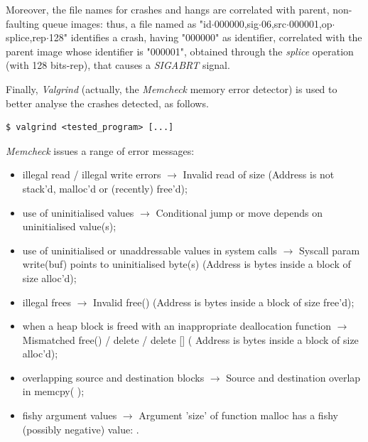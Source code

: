 Moreover, the file names for crashes and hangs are correlated with parent, non-faulting queue images\parencite{AFL_readme}: thus, a file named as "id$\cdot$000000,sig$\cdot$06,src$\cdot$000001,op$\cdot$splice,rep$\cdot$128" identifies a crash, having "000000" as identifier, correlated with the parent image whose identifier is "000001", obtained through the \textit{splice} operation (with 128 bits-rep), that causes a \textit{SIGABRT} signal.

Finally, \textit{Valgrind}\parencite{Valgrind} (actually, the \textit{Memcheck} memory error detector\parencite{MC}) is used to better analyse the crashes detected, as follows.
\begin{lstlisting}
$ valgrind <tested_program> [...]
\end{lstlisting}

\textit{Memcheck} issues a range of error messages:
\begin{itemize}
    \item illegal read / illegal write errors\parencite{MC_badrw} $\xrightarrow{}$ Invalid read of size \omissis (Address \omissis is not stack'd, malloc'd or (recently) free'd);
    \item use of uninitialised values\parencite{MC_uninitvals} $\xrightarrow{}$ Conditional jump or move depends on uninitialised value(s);
    \item use of uninitialised or unaddressable values in system calls\parencite{MC_bad-syscalls-args} $\xrightarrow{}$ Syscall param write(buf) points to uninitialised byte(s) (Address \omissis is \omissis bytes inside a block of size \omissis alloc'd);
    \item illegal frees\parencite{MC_badfrees} $\xrightarrow{}$ Invalid free() (Address \omissis is \omissis bytes inside a block of size \omissis free'd);
    \item when a heap block is freed with an inappropriate deallocation function\parencite{MC_rudefn} $\xrightarrow{}$ Mismatched free() / delete / delete [] ( Address \omissis is \omissis bytes inside a block of size \omissis alloc'd);
    \item overlapping source and destination blocks\parencite{MC_overlap} $\xrightarrow{}$ Source and destination overlap in memcpy( \omissis );
    \item fishy argument values\parencite{MC_fishyvalue} $\xrightarrow{}$ Argument 'size' of function malloc has a fishy (possibly negative) value: \omissis.
\end{itemize}

